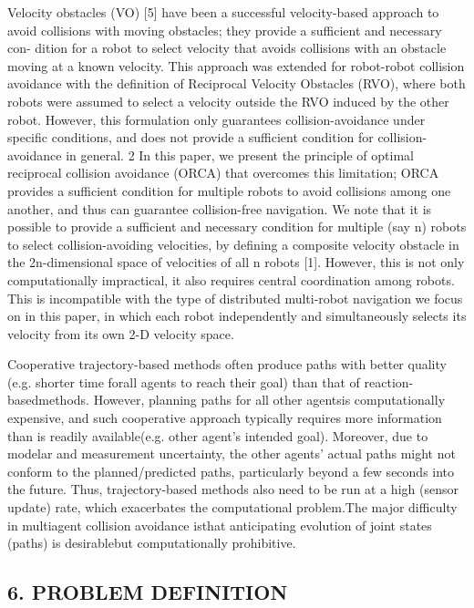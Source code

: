 \documentclass[12pt]{report}
\begin{document}
Velocity obstacles (VO) [5] have been a successful velocity-based approach to
avoid collisions with moving obstacles; they provide a sufficient and necessary con-
dition for a robot to select velocity that avoids collisions with an obstacle moving at
a known velocity. This approach was extended for robot-robot collision avoidance
with the definition of Reciprocal Velocity Obstacles (RVO), where both
robots were assumed to select a velocity outside the RVO induced by the other robot.
However, this formulation only guarantees collision-avoidance under specific conditions, and does not provide a sufficient condition for collision-avoidance in general. 2 In this paper, we present the principle of optimal reciprocal collision avoidance (ORCA) that overcomes this limitation; ORCA provides a sufficient condition for multiple robots to avoid collisions among one another, and thus can guarantee collision-free navigation.
We note that it is possible to provide a sufficient and necessary condition for
multiple (say n) robots to select collision-avoiding velocities, by defining a composite velocity obstacle in the 2n-dimensional space of velocities of all n robots [1]. However, this is not only computationally impractical, it also requires central coordination among robots. This is incompatible with the type of distributed multi-robot navigation we focus on in this paper, in which each robot independently and simultaneously selects its velocity from its own 2-D velocity space.

Cooperative trajectory-based methods often produce paths with better quality (e.g. shorter time forall  agents to reach their goal) than  that  of reaction-basedmethods. However, planning paths for all other agentsis computationally expensive, and such cooperative approach typically requires more information than is readily available(e.g. other agent’s intended goal). Moreover, due to modelar and measurement uncertainty, the other agents’ actual paths might not conform to the planned/predicted paths, particularly beyond a few seconds into the future. Thus, trajectory-based methods also need to be run at a high (sensor update) rate, which exacerbates the computational problem.The major difficulty in multiagent collision avoidance isthat anticipating evolution of joint states (paths) is desirablebut computationally prohibitive. 



\begin{center}
\chapter*{6. PROBLEM DEFINITION}
\end{center}
\end{document}
